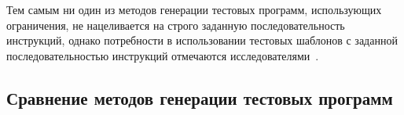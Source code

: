 Тем самым ни один из методов генерации тестовых программ,
использующих ограничения, не нацеливается на строго заданную
последовательность инструкций, однако потребности в использовании
тестовых шаблонов с заданной последовательностью инструкций
отмечаются исследователями~\cite{kamkin}.


\subsection{Сравнение методов генерации тестовых программ}

